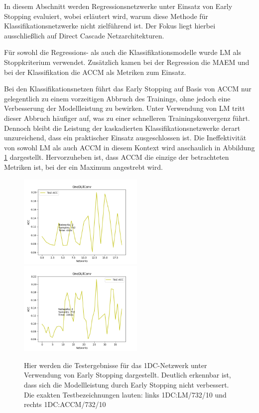 In diesem Abschnitt werden Regressionsnetzwerke unter Einsatz von Early Stopping evaluiert, wobei erläutert wird, warum diese Methode für 
Klassifikationsnetzwerke nicht zielführend ist. Der Fokus liegt hierbei ausschließlich auf Direct Cascade Netzarchitekturen.

Für sowohl die Regressions- als auch die Klassifikationsmodelle wurde LM als Stoppkriterium verwendet. Zusätzlich kamen bei der 
Regression die MAEM und bei der Klassifikation die ACCM als Metriken zum Einsatz.

Bei den Klassifikationsnetzen führt das Early Stopping auf Basis von ACCM nur gelegentlich zu einem vorzeitigen Abbruch des Trainings, ohne 
jedoch eine Verbesserung der Modellleistung zu bewirken. Unter Verwendung von LM tritt dieser Abbruch häufiger auf, was zu einer schnelleren 
Trainingskonvergenz führt. Dennoch bleibt die Leistung der kaskadierten Klassifikationsnetzwerke derart unzureichend, dass ein praktischer 
Einsatz ausgeschlossen ist. Die Ineffektivität von sowohl LM als auch ACCM in diesem Kontext wird anschaulich in 
Abbildung \ref{fig:1dconvmetrics} dargestellt. Hervorzuheben ist, dass ACCM die einzige der betrachteten Metriken ist, bei der ein Maximum 
angestrebt wird.

\begin{figure}[htpb]
    \includegraphics[height=4.5cm]{../../Plots/ba_plots/earlystopping/lossmetric/1dconv_ts.png}
    \includegraphics[height=4.5cm]{../../Plots/ba_plots/earlystopping/intermetric/1dconv_ts.png}
    \caption{\label{fig:1dconvmetrics} 
    \small{Hier werden die Testergebnisse für das 1DC-Netzwerk unter Verwendung von Early Stopping dargestellt. Deutlich erkennbar ist, dass sich 
    die Modellleistung durch Early Stopping nicht verbessert. Die exakten Testbezeichnungen lauten: links 1DC:LM/732/10 und rechts 1DC:ACCM/732/10}}
\end{figure}

